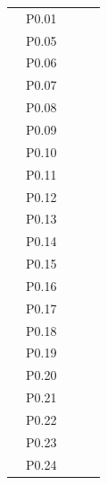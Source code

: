 \begin{table}[ht!]
\begin{subtable}[b]{.4\linewidth}
\begin{tabular}{l|l|l|l|l|}
			\multicolumn{1}{|l|}{} & P0.01  &               &             &             \\
			\multicolumn{1}{|l|}{} & P0.05  &               &             &             \\
			\multicolumn{1}{|l|}{} & P0.06  &               &             &             \\
			\multicolumn{1}{|l|}{} & P0.07  &               &             &             \\
			\multicolumn{1}{|l|}{} & P0.08  &               &             &             \\
			\multicolumn{1}{|l|}{} & P0.09  &               &             &             \\
			\multicolumn{1}{|l|}{} & P0.10  &               &             &             \\
			\hline \multicolumn{1}{|l|}{\multirow{18}{*}{\rotatebox{90}{P24}}} 
			& P0.11  &               &             & \checkmark  \\
			\multicolumn{1}{|l|}{} & P0.12  &               &             & \checkmark  \\
			\multicolumn{1}{|l|}{} & P0.13  &               & \checkmark  &             \\
			\multicolumn{1}{|l|}{} & P0.14  &               &             &             \\
			\multicolumn{1}{|l|}{} & P0.15  &               &             &             \\
			\multicolumn{1}{|l|}{} & P0.16  &               &             &             \\
			\multicolumn{1}{|l|}{} & P0.17  &               &             &             \\
			\multicolumn{1}{|l|}{} & P0.18  &               &             &             \\
			\multicolumn{1}{|l|}{} & P0.19  &               &             &             \\
			\multicolumn{1}{|l|}{} & P0.20  &               &             &             \\
			\multicolumn{1}{|l|}{} & P0.21  &               &             &             \\
			\multicolumn{1}{|l|}{} & P0.22  &               &             &             \\
			\multicolumn{1}{|l|}{} & P0.23  &               &             &             \\
			\multicolumn{1}{|l|}{} & P0.24  &               &             &             \\

\end{tabular}
\end{subtable}
\end{table}
